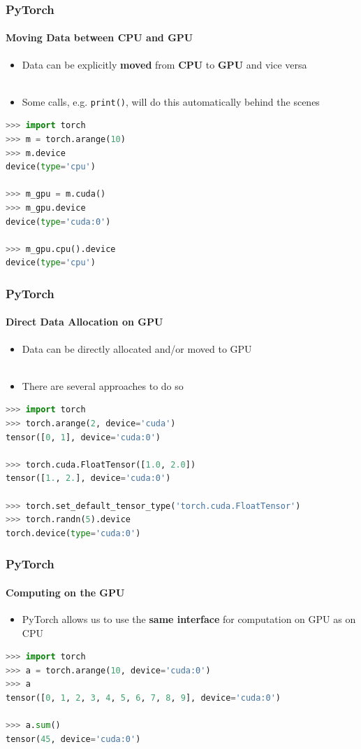 \documentclass[aspectratio=1610]{beamer}
\begin{document}
\begin{frame}[fragile]
    \frametitle{PyTorch}
    \framesubtitle{Moving Data between CPU and GPU}

    \begin{itemize}
        \item Data can be explicitly \textbf{moved} from \textbf{CPU} to \textbf{GPU} and vice versa\\~
        \item Some calls, e.g. \texttt{print()}, will do this automatically behind the scenes
    \end{itemize}
    \vspace{1em}
    \begin{lstlisting}[language=Python]
>>> import torch
>>> m = torch.arange(10)
>>> m.device
device(type='cpu')

>>> m_gpu = m.cuda()
>>> m_gpu.device
device(type='cuda:0')

>>> m_gpu.cpu().device
device(type='cpu')
    \end{lstlisting}
\end{frame}


\begin{frame}[fragile]
    \frametitle{PyTorch}
    \framesubtitle{Direct Data Allocation on GPU}
    
    \begin{itemize}
        \item Data can be directly allocated and/or moved to GPU\\~
        \item There are several approaches to do so
    \end{itemize}
    \vspace{1em}
    \begin{lstlisting}[language=Python]
>>> import torch
>>> torch.arange(2, device='cuda')
tensor([0, 1], device='cuda:0')

>>> torch.cuda.FloatTensor([1.0, 2.0])
tensor([1., 2.], device='cuda:0')

>>> torch.set_default_tensor_type('torch.cuda.FloatTensor')
>>> torch.randn(5).device
torch.device(type='cuda:0')
    \end{lstlisting}
\end{frame}

\begin{frame}[fragile]
    \frametitle{PyTorch}
    \framesubtitle{Computing on the GPU}
    
    \begin{itemize}
        \item PyTorch allows us to use the \textbf{same interface} for computation on GPU as on CPU
    \end{itemize}
    \vspace{1em}
    \begin{lstlisting}[language=Python]
>>> import torch
>>> a = torch.arange(10, device='cuda:0')
>>> a
tensor([0, 1, 2, 3, 4, 5, 6, 7, 8, 9], device='cuda:0')

>>> a.sum()
tensor(45, device='cuda:0')
    \end{lstlisting}
\end{frame}
\end{document}
